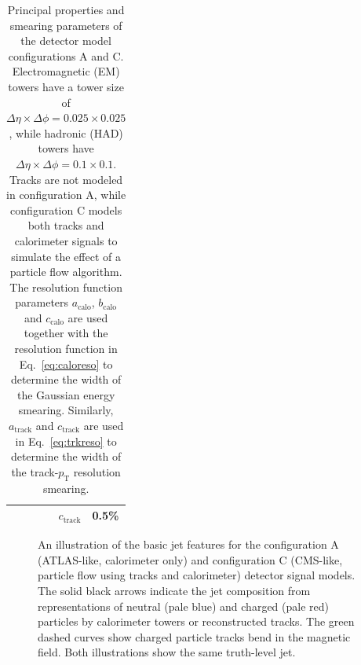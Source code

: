 \documentclass[11pt,letterpaper]{article}
\newcommand{\pt}{\ensuremath{p_{\text{T}}}}
\newcommand{\acalo}{\ensuremath{a_{\text{calo}}}}
\newcommand{\bcalo}{\ensuremath{b_{\text{calo}}}}
\newcommand{\ccalo}{\ensuremath{c_{\text{calo}}}}
\newcommand{\atrk}{\ensuremath{a_{\text{track}}}}
\newcommand{\ctrk}{\ensuremath{c_{\text{track}}}}
\begin{document}
\begin{table}
\begin{tabular}{|l|c|c|c|r@{\ =\ }l|}
           &                &         &           & \ctrk & 0.5\%                                     \\
\hline
\end{tabular}
\caption{Principal properties and smearing parameters of the detector model configurations A and C. Electromagnetic (EM) towers have a tower size of $\Delta\eta\times\Delta\phi = 0.025\times0.025$, while hadronic (HAD) towers have $\Delta\eta\times\Delta\phi = 0.1\times0.1$. Tracks are not modeled in configuration A, while configuration C models both tracks and calorimeter signals to simulate the effect of a particle flow algorithm. The resolution function parameters \acalo, \bcalo{} and \ccalo{} are used together with the resolution function in Eq.~\ref{eq:caloreso} to determine the width of the Gaussian energy smearing.
Similarly, \atrk{} and \ctrk{} are used in Eq.~\ref{eq:trkreso} to determine the width of the track-\pt{} resolution smearing.}
\label{tab:detmodel}
\end{table}





\begin{figure}
\begin{center}
\end{center}
\caption{An illustration of the basic jet features for the configuration A (ATLAS-like, calorimeter only) and configuration C (CMS-like, particle flow using tracks and calorimeter) detector signal models. The solid black arrows indicate the jet composition from representations of neutral (pale blue) and charged (pale red) particles by calorimeter towers or reconstructed tracks. The green dashed curves show charged particle tracks bend in the magnetic field. Both illustrations show the same truth-level jet.}
\label{fig:detmodel}
\end{figure}
\end{document}

